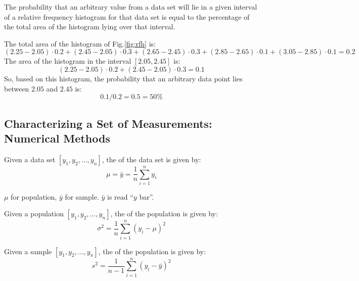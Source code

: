 \begin{note}
    The probability that an arbitrary value from a data set will lie in a given interval of a relative frequency histogram for that data set is equal to the percentage of the total area of the histogram lying over that interval.
\end{note}

\begin{exmp}
    The total area of the histogram of Fig.\ref{fig:rfh} is: $$(2.25 - 2.05)\cdot 0.2 + (2.45 - 2.05)\cdot 0.3 + (2.65 - 2.45)\cdot 0.3 + (2.85 - 2.65)\cdot 0.1 + (3.05 - 2.85)\cdot 0.1 = 0.2$$
    The area of the histogram in the interval $[2.05, 2.45]$ is: $$(2.25 - 2.05)\cdot 0.2 + (2.45 - 2.05)\cdot 0.3 = 0.1$$
    So, based on this histogram, the probability that an arbitrary data point lies between $2.05$ and $2.45$ is: $$0.1 / 0.2 = 0.5 = 50\%$$
\end{exmp}

\subsection{Characterizing a Set of Measurements: Numerical Methods}

\begin{defn}
    Given a data set $[y_{1}, y_{2}, \ldots, y_{n}]$, the  of the data set is given by: $$\mu = \bar{y} = \frac{1}{n} \sum_{i=1}^{n} y_{i}$$
\end{defn}

\begin{nota}
    $\mu$ for population, $\bar{y}$ for sample. $\bar{y}$ is read ``$y$ bar''.
\end{nota}

\begin{defn}
    Given a population $[y_{1}, y_{2}, \ldots, y_{n}]$, the  of the population is given by: $$\sigma^{2} = \frac{1}{n} \sum_{i=1}^{n} (y_{i} - \mu)^{2}$$
\end{defn}

\begin{nota}
\end{nota}

\pagebreak
\begin{defn}
    Given a sample $[y_{1}, y_{2}, \ldots, y_{n}]$, the  of the population is given by: $$s^{2} = \frac{1}{n-1} \sum_{i=1}^{n} (y_{i} - \bar{y})^{2}$$
\end{defn}

